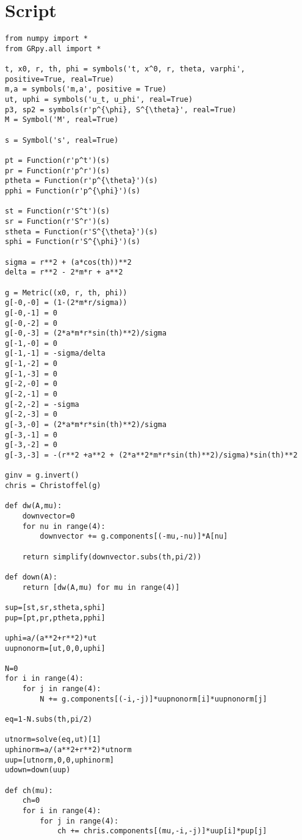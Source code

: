 \chapter{Script}
\label{ape:5}

\begin{verbatim}
from numpy import *
from GRpy.all import *

t, x0, r, th, phi = symbols('t, x^0, r, theta, varphi', 
positive=True, real=True)
m,a = symbols('m,a', positive = True)
ut, uphi = symbols('u_t, u_phi', real=True)
p3, sp2 = symbols(r'p^{\phi}, S^{\theta}', real=True)
M = Symbol('M', real=True)

s = Symbol('s', real=True)

pt = Function(r'p^t')(s)
pr = Function(r'p^r')(s)
ptheta = Function(r'p^{\theta}')(s)
pphi = Function(r'p^{\phi}')(s)

st = Function(r'S^t')(s)
sr = Function(r'S^r')(s)
stheta = Function(r'S^{\theta}')(s)
sphi = Function(r'S^{\phi}')(s)

sigma = r**2 + (a*cos(th))**2
delta = r**2 - 2*m*r + a**2

g = Metric((x0, r, th, phi))
g[-0,-0] = (1-(2*m*r/sigma))
g[-0,-1] = 0
g[-0,-2] = 0
g[-0,-3] = (2*a*m*r*sin(th)**2)/sigma
g[-1,-0] = 0
g[-1,-1] = -sigma/delta
g[-1,-2] = 0
g[-1,-3] = 0
g[-2,-0] = 0
g[-2,-1] = 0
g[-2,-2] = -sigma
g[-2,-3] = 0
g[-3,-0] = (2*a*m*r*sin(th)**2)/sigma
g[-3,-1] = 0
g[-3,-2] = 0
g[-3,-3] = -(r**2 +a**2 + (2*a**2*m*r*sin(th)**2)/sigma)*sin(th)**2

ginv = g.invert()
chris = Christoffel(g)

def dw(A,mu):
    downvector=0
    for nu in range(4):
        downvector += g.components[(-mu,-nu)]*A[nu]
    
    return simplify(downvector.subs(th,pi/2))

def down(A):
    return [dw(A,mu) for mu in range(4)]

sup=[st,sr,stheta,sphi]
pup=[pt,pr,ptheta,pphi]

uphi=a/(a**2+r**2)*ut
uupnonorm=[ut,0,0,uphi]

N=0
for i in range(4):
    for j in range(4):
        N += g.components[(-i,-j)]*uupnonorm[i]*uupnonorm[j]
        
eq=1-N.subs(th,pi/2)

utnorm=solve(eq,ut)[1]
uphinorm=a/(a**2+r**2)*utnorm
uup=[utnorm,0,0,uphinorm]
udown=down(uup)

def ch(mu):
    ch=0
    for i in range(4):
        for j in range(4):
            ch += chris.components[(mu,-i,-j)]*uup[i]*pup[j]
        

\end{verbatim}
